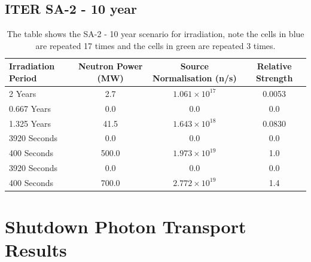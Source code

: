 \documentclass[12pt]{article}
\begin{document}
\subsection{ITER SA-2 - 10 year}
\begin{table}[ht!]
   \begin{tabular}{| l | c | c | c |}
      \hline 
      Irradiation Period & Neutron Power (MW) & Source Normalisation (n/s) &  Relative Strength \\
      \hline
      2 Years & 2.7 & $1.061\times10^{17}$ & 0.0053 \\
      0.667 Years & 0.0 & 0.0 & 0.0 \\
      1.325 Years & 41.5 & $1.643\times10^{18}$ & 0.0830 \\
      \cellcolor{blue!25} 3920 Seconds & \cellcolor{blue!25} 0.0 & \cellcolor{blue!25} 0.0 & \cellcolor{blue!25} 0.0 \\
      \cellcolor{blue!25} \cellcolor{blue!25} 400 Seconds & \cellcolor{blue!25} 500.0 & \cellcolor{blue!25} $1.973\times10^{19}$ & \cellcolor{blue!25} 1.0  \\
      \cellcolor{green!25} 3920 Seconds & \cellcolor{green!25} 0.0 & \cellcolor{green!25} 0.0 &\cellcolor{green!25} 0.0 \\
      \cellcolor{green!25} 400 Seconds & \cellcolor{green!25} 700.0 & \cellcolor{green!25} $2.772\times10^{19}$ &\cellcolor{green!25} 1.4 \\
      \hline
\end{tabular}
\caption{The table shows the SA-2 - 10 year scenario for irradiation, note the
         cells in \textcolor{blue!25}{blue} are repeated 17 times
         and the cells in \textcolor{green!25}{green} are repeated 3
         times.}
\end{table}

\newpage
\section{Shutdown Photon Transport Results}
\label{sec:sdr_results}
\end{document}
